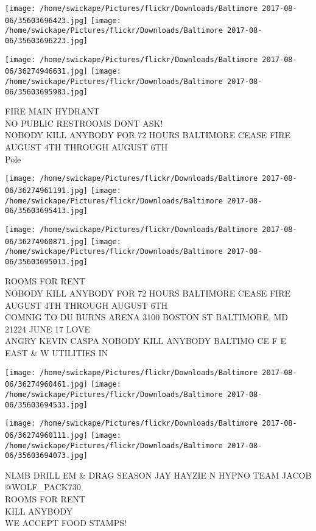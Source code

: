 \documentclass[10pt,letterpaper]{article}
\begin{document}
\texttt{[image: /home/swickape/Pictures/flickr/Downloads/Baltimore 2017-08-06/35603696423.jpg]}
\texttt{[image: /home/swickape/Pictures/flickr/Downloads/Baltimore 2017-08-06/35603696223.jpg]}

\texttt{[image: /home/swickape/Pictures/flickr/Downloads/Baltimore 2017-08-06/36274946631.jpg]}
\texttt{[image: /home/swickape/Pictures/flickr/Downloads/Baltimore 2017-08-06/35603695983.jpg]}

FIRE MAIN HYDRANT\\
NO PUBLIC RESTROOMS DONT ASK!\\
NOBODY KILL ANYBODY FOR 72 HOURS BALTIMORE CEASE FIRE AUGUST 4TH THROUGH AUGUST 6TH\\
Pole\\
\pagebreak

\texttt{[image: /home/swickape/Pictures/flickr/Downloads/Baltimore 2017-08-06/36274961191.jpg]}
\texttt{[image: /home/swickape/Pictures/flickr/Downloads/Baltimore 2017-08-06/35603695413.jpg]}

\texttt{[image: /home/swickape/Pictures/flickr/Downloads/Baltimore 2017-08-06/36274960871.jpg]}
\texttt{[image: /home/swickape/Pictures/flickr/Downloads/Baltimore 2017-08-06/35603695013.jpg]}

ROOMS FOR RENT\\
NOBODY KILL ANYBODY FOR 72 HOURS BALTIMORE CEASE FIRE AUGUST 4TH THROUGH AUGUST 6TH\\
COMNIG TO DU BURNS ARENA 3100 BOSTON ST BALTIMORE, MD 21224 JUNE 17 LOVE\\
ANGRY KEVIN CASPA NOBODY KILL ANYBODY BALTIMO CE F E EAST \& W UTILITIES IN\\
\pagebreak

\texttt{[image: /home/swickape/Pictures/flickr/Downloads/Baltimore 2017-08-06/36274960461.jpg]}
\texttt{[image: /home/swickape/Pictures/flickr/Downloads/Baltimore 2017-08-06/35603694533.jpg]}

\texttt{[image: /home/swickape/Pictures/flickr/Downloads/Baltimore 2017-08-06/36274960111.jpg]}
\texttt{[image: /home/swickape/Pictures/flickr/Downloads/Baltimore 2017-08-06/35603694073.jpg]}

NLMB DRILL EM \& DRAG SEASON JAY HAYZIE N HYPNO TEAM JACOB @WOLF\_PACK730\\
ROOMS FOR RENT\\
KILL ANYBODY\\
WE ACCEPT FOOD STAMPS!\\
\pagebreak
\end{document}
